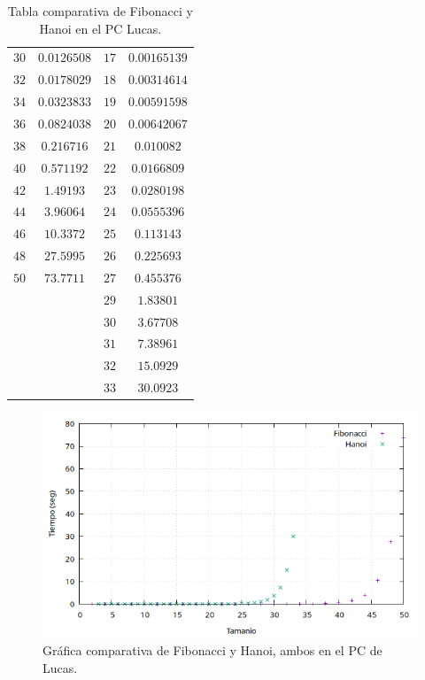 \documentclass[12pt]{article}
\begin{document}
\begin{table}
\begin{tabular}{|c|c||c|c|}
            $30$ & $0.0126508$ & $17$ & $0.00165139$ \\
            $32$ & $0.0178029$ & $18$ & $0.00314614$ \\
            $34$ & $0.0323833$ & $19$ & $0.00591598$ \\
            $36$ & $0.0824038$ & $20$ & $0.00642067$ \\
            $38$ & $0.216716$ & $21$ & $0.010082$ \\
            $40$ & $0.571192$ & $22$ & $0.0166809$ \\
            $42$ & $1.49193$ & $23$ & $0.0280198$ \\
            $44$ & $3.96064$ & $24$ & $0.0555396$ \\
            $46$ & $10.3372$ & $25$ & $0.113143$ \\
            $48$ & $27.5995$ & $26$ & $0.225693$ \\
            $50$ & $73.7711$ & $27$ & $0.455376$ \\
            & & $29$ & $1.83801$ \\
            & & $30$ & $3.67708$ \\
            & & $31$ & $7.38961$ \\
            & & $32$ & $15.0929$ \\
            & & $33$ & $30.0923$ \\
            \hline
        \end{tabular}
        \caption{Tabla comparativa de Fibonacci y Hanoi en el PC Lucas.}
        \label{tab:fibonacci_hanoi}
    \end{table}

    \begin{figure}
        \centering
        \includegraphics[width=\linewidth]{images/Comparaciones/fibonacci_hanoi_puntos.png}
        \caption{Gráfica comparativa de Fibonacci y Hanoi, ambos en el PC de Lucas.}
        \label{fig:fibo_hanoi_puntos}
    \end{figure}
\end{document}
